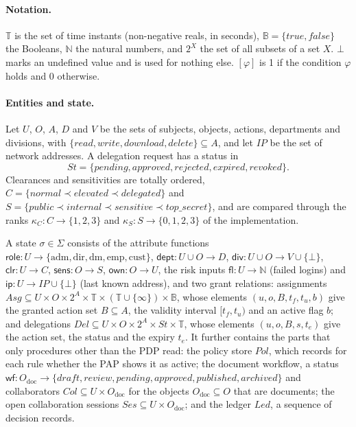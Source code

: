 \documentclass[sigconf,review,anonymous]{acmart}
\newcommand{\role}{\mathsf{role}}
\newcommand{\emp}{\mathrm{emp}}
\begin{document}
\paragraph{Notation.} $\mathbb{T}$ is the set of time instants (non-negative reals, in seconds), $\mathbb{B}=\{\mathit{true},\mathit{false}\}$
the Booleans, $\mathbb{N}$ the natural numbers, and $2^X$ the set of all subsets of a set $X$. $\bot$ marks an
undefined value and is used for nothing else. $[\varphi]$ is 1 if the condition $\varphi$ holds and 0 otherwise.

\paragraph{Entities and state.} Let $U$, $O$, $A$, $D$ and $V$ be the sets of subjects, objects, actions,
departments and divisions, with $\{\mathit{read},\mathit{write},\mathit{download},\mathit{delete}\}\subseteq A$,
and let $\mathit{IP}$ be the set of network addresses. A delegation request has a status in
\[
\mathit{St}=\{\mathit{pending},\mathit{approved},\mathit{rejected},\mathit{expired},\mathit{revoked}\}.
\]
Clearances and sensitivities are totally ordered,
$C=\{\mathit{normal}\prec\mathit{elevated}\prec\mathit{delegated}\}$ and
$S=\{\mathit{public}\prec\mathit{internal}\prec\mathit{sensitive}\prec\mathit{top\_secret}\}$, and are compared
through the ranks $\kappa_C:C\to\{1,2,3\}$ and $\kappa_S:S\to\{0,1,2,3\}$ of the implementation.

\begin{definition}[State]\label{def:state}
A state $\sigma\in\Sigma$ consists of the attribute functions
$\role:U\to\{\mathrm{adm},\mathrm{dir},\mathrm{dm},\emp,\mathrm{cust}\}$, $\mathsf{dept}:U\cup O\to D$,
$\mathsf{div}:U\cup O\to V\cup\{\bot\}$, $\mathsf{clr}:U\to C$, $\mathsf{sens}:O\to S$, $\mathsf{own}:O\to U$, the
risk inputs $\mathsf{fl}:U\to\mathbb{N}$ (failed logins) and $\mathsf{ip}:U\to\mathit{IP}\cup\{\bot\}$ (last known
address), and two grant relations: assignments $\mathit{Asg}\subseteq U\times O\times 2^A\times\mathbb{T}\times
(\mathbb{T}\cup\{\infty\})\times\mathbb{B}$, whose elements $(u,o,B,t_f,t_u,b)$ give the granted action
set $B\subseteq A$, the validity interval $[t_f,t_u)$ and an active flag $b$; and
delegations $\mathit{Del}\subseteq U\times O\times 2^A\times\mathit{St}\times\mathbb{T}$, whose elements
$(u,o,B,s,t_e)$ give the action set, the status and the expiry $t_e$. It further contains the parts that only
procedures other than the PDP read: the policy store $\mathit{Pol}$, which records for each rule whether the PAP
shows it as active; the document workflow, a status
$\mathsf{wf}:O_{\mathrm{doc}}\to\{\mathit{draft},\mathit{review},\mathit{pending},\mathit{approved},
\mathit{published},\mathit{archived}\}$ and collaborators $\mathit{Col}\subseteq U\times O_{\mathrm{doc}}$ for the
objects $O_{\mathrm{doc}}\subseteq O$ that are documents; the open collaboration sessions
$\mathit{Ses}\subseteq U\times O_{\mathrm{doc}}$; and the ledger $\mathit{Led}$, a sequence of decision records.
\end{definition}
\end{document}
